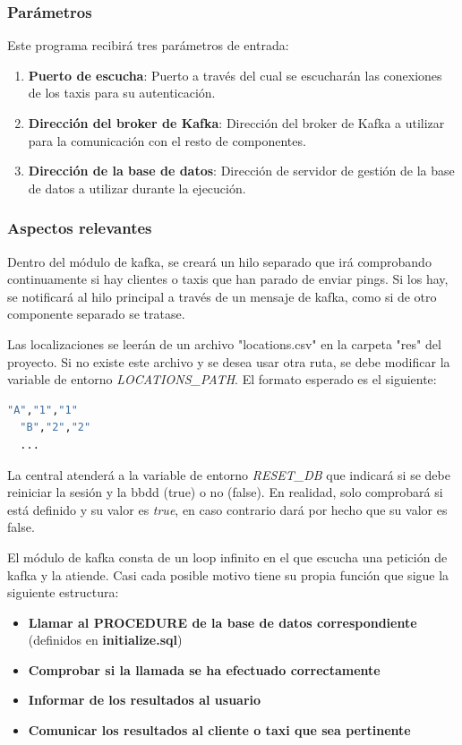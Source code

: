 \documentclass[a4paper,12pt]{article}
\begin{document}
\subsubsection{Parámetros}
Este programa recibirá tres parámetros de entrada:
\begin{enumerate}
  \item \textbf{Puerto de escucha}: Puerto a través del cual se escucharán las conexiones de los taxis para su autenticación.
  \item \textbf{Dirección del broker de Kafka}: Dirección del broker de Kafka a utilizar para la comunicación con el resto de componentes.
  \item \textbf{Dirección de la base de datos}: Dirección de servidor de gestión de la base de datos a utilizar durante la ejecución.
\end{enumerate}
\subsubsection{Aspectos relevantes}
Dentro del módulo de kafka, se creará un hilo separado que irá comprobando continuamente si hay clientes o taxis que han parado de
enviar pings. Si los hay, se notificará al hilo principal a través de un mensaje de kafka, como si de otro componente separado se tratase.
\par
Las localizaciones se leerán de un archivo "locations.csv" en la carpeta "res" del proyecto. Si no existe este archivo y se desea usar otra
ruta, se debe modificar la variable de entorno \textit{LOCATIONS\_PATH}. El formato esperado es el siguiente:
\begin{lstlisting}[language=bash]
  "A","1","1"
  "B","2","2"
  ...
\end{lstlisting}
\par
La central atenderá a la variable de entorno \textit{RESET\_DB} que indicará si se debe reiniciar la sesión y la bbdd (true) o no (false).
En realidad, solo comprobará si está definido y su valor es \textit{true}, en caso contrario dará por hecho que su valor es false.
\par
El módulo de kafka consta de un loop infinito en el que escucha una petición de kafka y la atiende. Casi cada posible motivo
tiene su propia función que sigue la siguiente estructura:
\begin{itemize}
  \item \textbf{Llamar al PROCEDURE de la base de datos correspondiente} (definidos en \textbf{initialize.sql})
  \item \textbf{Comprobar si la llamada se ha efectuado correctamente}
  \item \textbf{Informar de los resultados al usuario}
  \item \textbf{Comunicar los resultados al cliente o taxi que sea pertinente}
\end{itemize}
\end{document}
